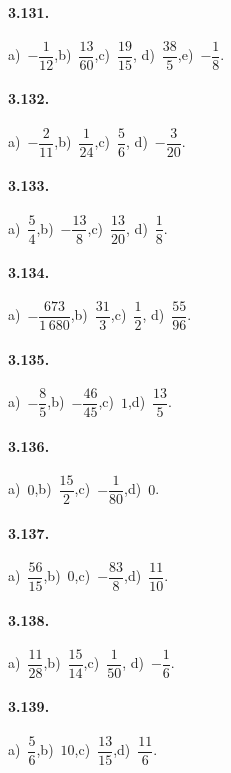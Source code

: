 \begin{multicols}{2}
\paragraph{3.131.}
a)~$-\dfrac{1}{12}$,\quad b)~$\dfrac{13}{60}$,\quad c)~$\dfrac{19}{15}$,\quad %
d)~$\dfrac{38}{5}$,\quad e)~$-\dfrac{1}{8}$.

\paragraph{3.132.}
a)~$-\dfrac{2}{11}$,\quad b)~$\dfrac{1}{24}$,\quad c)~$\dfrac{5}{6}$,%
\quad d)~$-\dfrac{3}{20}$.

\paragraph{3.133.}
a)~$\dfrac{5}{4}$,\quad b)~$-\dfrac{13}{8}$,\quad c)~$\dfrac{13}{20}$,%
\quad d)~$\dfrac{1}{8}$.

\paragraph{3.134.}
a)~$-\dfrac{673}{1\,680}$,\quad b)~$\dfrac{31}{3}$,\quad c)~$\dfrac{1}{2}$,%
\quad d)~$\dfrac{55}{96}$.

\paragraph{3.135.}
a)~$-\dfrac{8}{5}$,\quad b)~$-\dfrac{46}{45}$,\quad c)~$1$,\quad d)~$\dfrac{13}{5}$.

\paragraph{3.136.}
a)~$0$,\quad b)~$\dfrac{15}{2}$,\quad c)~$-\dfrac{1}{80}$,\quad d)~$0$.

\paragraph{3.137.}
a)~$\dfrac{56}{15}$,\quad b)~$0$,\quad c)~$-\dfrac{83}{8}$,\quad d)~$\dfrac{11}{10}$.

\paragraph{3.138.}
a)~$\dfrac{11}{28}$,\quad b)~$\dfrac{15}{14}$,\quad c)~$\dfrac{1}{50}$,\quad %
d)~$-\dfrac{1}{6}$.

\paragraph{3.139.}
a)~$\dfrac{5}{6}$,\quad b)~$10$,\quad c)~$\dfrac{13}{15}$,\quad d)~$\dfrac{11}{6}$.


\end{multicols}
